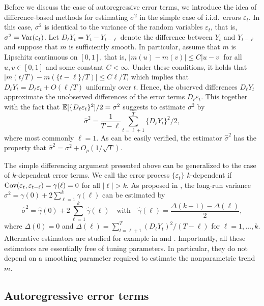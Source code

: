 \documentclass[a4paper,12pt]{article}
\numberwithin{equation}{section}
\begin{document}
Before we discuss the case of autoregressive error terms, we introduce the idea of difference-based methods for estimating $\sigma^2$ in the simple case of i.i.d.\ errors $\varepsilon_t$. In this case, $\sigma^2$ is identical to the variance of the random variables $\varepsilon_t$, that is, $\sigma^2 = \textnormal{Var}(\varepsilon_t)$. Let $D_\ell Y_t = Y_t - Y_{t-\ell}$ denote the difference between $Y_t$ and $Y_{t-\ell}$ and suppose that $m$ is sufficiently smooth. In particular, assume that $m$ is Lipschitz continuous on $[0,1]$, that is, $|m(u) - m(v)| \le C|u - v|$ for all $u,v \in [0,1]$ and some constant $C < \infty$. Under these conditions, it holds that $|m(t/T) - m(\{t-\ell\}/T)| \le C \ell/T$, which implies that $D_\ell Y_t = D_\ell \varepsilon_t + O(\ell/T)$ uniformly over $t$. Hence, the observed differences $D_\ell Y_t$ approximate the unobserved differences of the error terms $D_\ell \varepsilon_t$. This together with the fact that $\mathbb{E}[ \{D_\ell \varepsilon_t\}^2]/2 = \sigma^2$ suggests to estimate $\sigma^2$ by 
\[ \widehat{\sigma}^2 = \frac{1}{T-\ell} \sum\limits_{t=\ell+1}^T \{ D_\ell Y_t \}^2 \big/ 2, \]
where most commonly $\ell = 1$. As can be easily verified, the estimator $\widehat{\sigma}^2$ has the property that $\widehat{\sigma}^2 = \sigma^2 + O_p(1/\sqrt{T})$. 


The simple differencing argument presented above can be generalized to the case of $k$-dependent error terms. We call the error process $\{\varepsilon_t\}$ $k$-dependent if $\textnormal{Cov}(\varepsilon_t,\varepsilon_{t-\ell}) = \gamma(\ell) = 0$ for all $|\ell| > k$. As proposed in \cite{MuellerStadtmueller1988}, the long-run variance $\sigma^2 = \gamma(0) + 2 \sum\nolimits_{\ell=1}^{k} \gamma(\ell)$ can be estimated by 
\[ \widehat{\sigma}^2 = \widehat{\gamma}(0) + 2 \sum\limits_{\ell=1}^k \widehat{\gamma}(\ell) \quad \text{with} \quad \widehat{\gamma}(\ell) = \frac{\Delta(k+1) - \Delta(\ell)}{2}, \]
where $\Delta(0) = 0$ and $\Delta(\ell) = \sum_{t=\ell+1}^T (D_\ell Y_t)^2 / (T-\ell)$ for $\ell = 1,\ldots,k$.
Alternative estimators are studied for example in \cite{Herrmann1992} and \cite{Munk2017}. Importantly, all these estimators are essentially free of tuning parameters. In particular, they do not depend on a smoothing parameter required to estimate the nonparametric trend $m$. 
 

\subsection{Autoregressive error terms}
\end{document}
